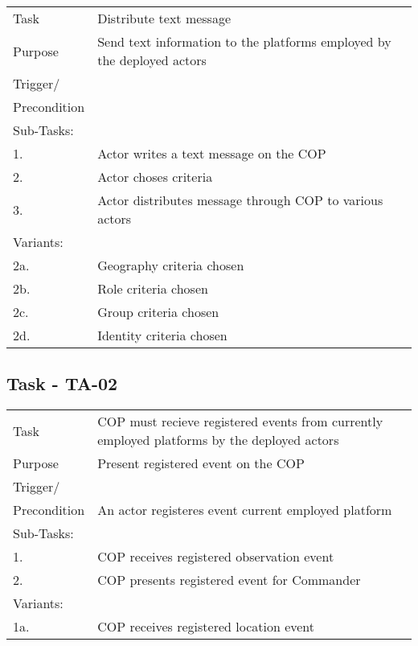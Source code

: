 \begin{longtable}{| p{2.5cm}  | p{10cm} |  }
	\hline
	Task & Distribute text message \\
	Purpose & Send text information to the platforms employed by the  deployed actors \\
	Trigger/ &  \\ Precondition &  \\
	\hline
	Sub-Tasks: & \\
	1. & Actor writes a text message on the COP \\
	2. & Actor choses criteria \\
	3. & Actor distributes message through COP to various actors \\
	\hline
	Variants: & \\
	2a. & Geography criteria chosen \\
	2b. & Role criteria chosen\\
	2c. & Group criteria chosen\\
	2d. & Identity criteria chosen\\
	\hline
\end{longtable}

\FloatBarrier
\newpage

\subsection{Task - TA-02}

\begin{longtable}{| p{2.5cm}  | p{10cm} |  }
	\hline
	Task & COP must recieve registered events from currently employed platforms by the deployed actors  \\
	Purpose & Present registered event on the COP \\
	Trigger/ &  \\ Precondition & An actor registeres event current employed platform \\
	\hline
	Sub-Tasks: & \\
	1. & COP receives registered observation event \\
	2. & COP presents registered event for Commander \\
	\hline
	Variants: & \\
	1a. & COP receives registered location event \\
	\hline
\end{longtable}

